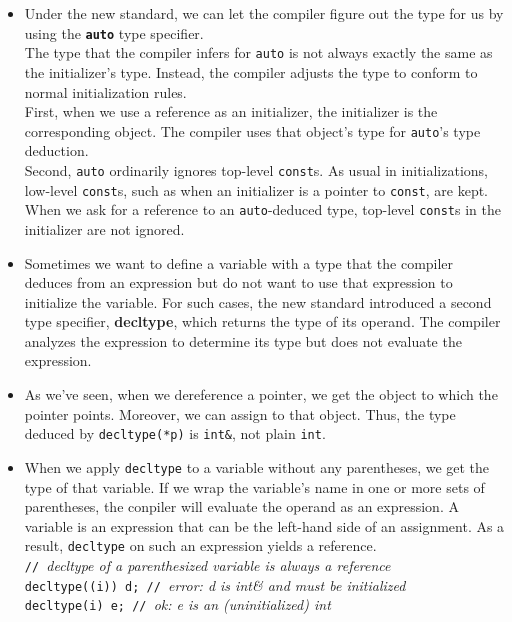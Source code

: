 \begin{itemize}
\item Under the new standard, we can let the compiler figure out the type for us by using the \textbf{\texttt{auto}} type specifier.\\The type that the compiler infers for \texttt{auto} is not always exactly the same as the initializer's type. Instead, the compiler adjusts the type to conform to normal initialization rules.\\First, when we use a reference as an initializer, the initializer is the corresponding object. The compiler uses that object's type for \texttt{auto}'s type deduction.\\Second, \texttt{auto} ordinarily ignores top-level \texttt{const}s. As usual in initializations, low-level \texttt{const}s, such as when an initializer is a pointer to \texttt{const}, are kept.\\When we ask for a reference to an \texttt{auto}-deduced type, top-level \texttt{const}s in the initializer are not ignored.

\item Sometimes we want to define a variable with a type that the compiler deduces from an expression but do not want to use that expression to initialize the variable. For such cases, the new standard introduced a second type specifier, \textbf{decltype}, which returns the type of its operand. The compiler analyzes the expression to determine its type but does not evaluate the expression.

\item As we've seen, when we dereference a pointer, we get the object to which the pointer points. Moreover, we can assign to that object. Thus, the type deduced by \texttt{decltype(*p)} is \texttt{int\&}, not plain \texttt{int}.

\item When we apply \texttt{decltype} to a variable without any parentheses, we get the type of that variable. If we wrap the variable's name in one or more sets of parentheses, the conpiler will evaluate the operand as an expression. A variable is an expression that can be the left-hand side of an assignment. As a result, \texttt{decltype} on such an expression yields a reference.\\\hspace*{1em}\texttt{// }\textit{decltype of a parenthesized variable is always a reference}\\\hspace{1em}\texttt{decltype((i)) d; // }\textit{error: d is int\& and must be initialized}\\\hspace*{1em}\texttt{decltype(i) e; // }\textit{ok: e is an (uninitialized) int}


\end{itemize}

